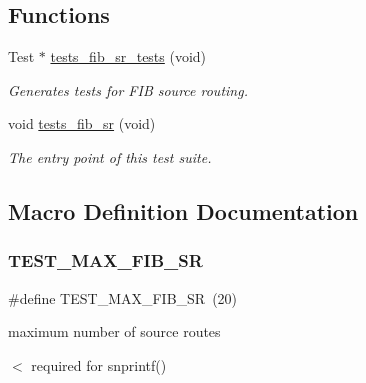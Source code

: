 \subsection*{Functions}
\begin{DoxyCompactItemize}
\item 
Test $\ast$ \hyperlink{group__unittests_ga61dfd0327d9f733fa863525f836b9c33}{tests\+\_\+fib\+\_\+sr\+\_\+tests} (void)
\begin{DoxyCompactList}\small\item\em Generates tests for F\+IB source routing. \end{DoxyCompactList}\item 
void \hyperlink{group__unittests_ga81367a9f08a307f54d685b422cf97f3d}{tests\+\_\+fib\+\_\+sr} (void)
\begin{DoxyCompactList}\small\item\em The entry point of this test suite. \end{DoxyCompactList}\end{DoxyCompactItemize}


\subsection{Macro Definition Documentation}
\mbox{\label{tests-fib__sr_8c_aa8679d92c7fab6c82b146daa69821eef}} 
\subsubsection{\texorpdfstring{T\+E\+S\+T\+\_\+\+M\+A\+X\+\_\+\+F\+I\+B\+\_\+\+SR}{TEST\_MAX\_FIB\_SR}}
{\footnotesize\ttfamily \#define T\+E\+S\+T\+\_\+\+M\+A\+X\+\_\+\+F\+I\+B\+\_\+\+SR~(20)}



maximum number of source routes 

$<$ required for snprintf() \mbox{\label{tests-fib__sr_8c_a1206b7ee83ad53daf8b2a8fc1f07483c}} 
